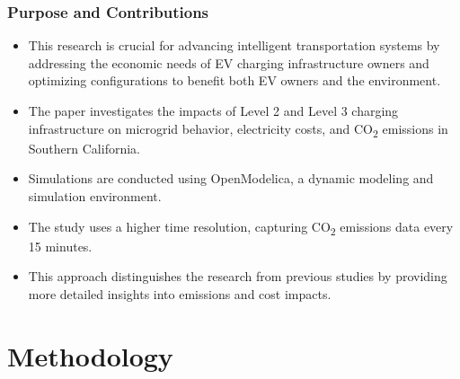 \documentclass[aspectratio=169, 8 pt]{beamer}
\begin{document}
%	
	\begin{frame}
		\frametitle{Purpose and Contributions}
		\begin{itemize} \LARGE
			\item This research is crucial for advancing intelligent transportation systems by addressing the economic needs of EV charging infrastructure owners and optimizing configurations to benefit both EV owners and the environment.
			\item The paper investigates the impacts of Level 2 and Level 3 charging infrastructure on microgrid behavior, electricity costs, and CO\textsubscript{2} emissions in Southern California.
			\item Simulations are conducted using OpenModelica, a dynamic modeling and simulation environment.
			\item The study uses a higher time resolution, capturing CO\textsubscript{2} emissions data every 15 minutes.
			\item This approach distinguishes the research from previous studies by providing more detailed insights into emissions and cost impacts.
		\end{itemize}
		
	\end{frame}
	
	\section{Methodology}
	
\end{document}
